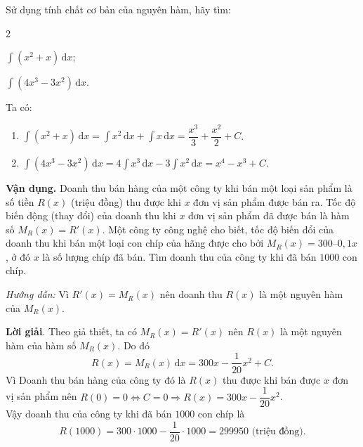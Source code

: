 \documentclass[12pt,aspectratio=169]{beamer}
\begin{document}
\begin{vd}
	Sử dụng tính chất cơ bản của nguyên hàm, hãy tìm:
	\begin{enumEX}{2}
		\item $\displaystyle\int \left(x^2+x\right)\mathrm{\,d}x$;
		\item $\displaystyle\int \left(4x^3-3x^2\right)\mathrm{\,d}x$.
	\end{enumEX}

	\begin{loigiai}
		Ta có:
		\begin{enumerate}
			\item $\displaystyle\int \left(x^2+x\right)\mathrm{\,d}x = \displaystyle\int x^2\mathrm{\,d}x + \displaystyle\int x\mathrm{\,d}x = \dfrac{x^3}{3} + \dfrac{x^2}{2} + C$.
			\item $\displaystyle\int \left(4x^3-3x^2\right)\mathrm{\,d}x = 4\displaystyle\int x^3\mathrm{\,d}x - 3\displaystyle\int x^2 \mathrm{\,d}x = x^4-x^3 + C$.
		\end{enumerate}
	\end{loigiai}
\end{vd}

\begin{frame}[allowframebreaks]
\noindent
{\color{mauvang}\textbf{Vận dụng.}} Doanh thu bán hàng của một công ty khi bán một loại sản phẩm là số tiền $R(x)$ (triệu đồng) thu được khi $x$ đơn vị sản phẩm được bán ra. Tốc độ biến động (thay đổi) của doanh thu khi $x$ đơn vị sản phẩm đã được bán là hàm số $M_R(x)=R'(x)$. Một công ty công nghệ cho biết, tốc độ biến đổi của doanh thu khi bán một loại con chíp của hãng được cho bởi $M_R(x) = 300 – 0{,}1x$, ở đó $x$ là số lượng chíp đã bán. Tìm doanh thu của công ty khi đã bán $1 000$ con chíp.

\textit{Hướng dẫn:} Vì $R'(x) = M_R(x)$ nên doanh thu $R(x)$ là một nguyên hàm của $M_R(x)$.

\noindent
\textbf{Lời giải}.
	Theo giả thiết, ta có $M_R(x)=R'(x)$ nên $R(x)$ là một nguyên hàm của hàm số $M_R(x)$. Do đó
	$$R(x)=\displaystyle M_R(x) \mathrm{\, d}x=300x-\dfrac{1}{20}x^2+C.$$
	Vì Doanh thu bán hàng của công ty đó là $R(x)$ thu được khi bán được $x$ đơn vị sản phẩm nên $R(0)=0\Leftrightarrow C=0\Rightarrow R(x)=300x-\dfrac{1}{20}x^2$.\\
	Vậy doanh thu của công ty khi đã bán $1000$ con chíp là
	$$R(1000)=300\cdot 1000 - \dfrac{1}{20}\cdot 1000 = 299950 \text{ (triệu đồng)}.$$
\end{frame}
\end{document}
